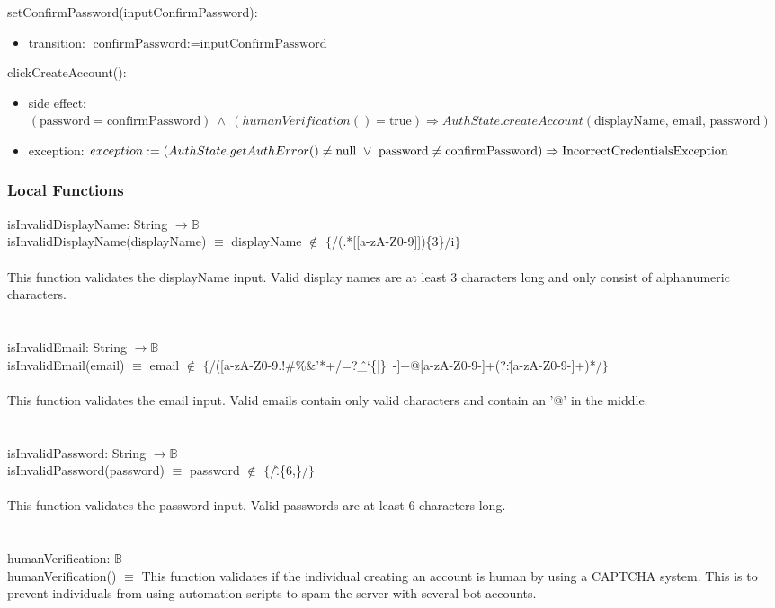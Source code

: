 \documentclass[12pt, titlepage]{article}
\begin{document}
\noindent setConfirmPassword(inputConfirmPassword):
\begin{itemize}
\item transition: $\text{confirmPassword} := \text{inputConfirmPassword}$
\end{itemize}

\noindent clickCreateAccount():
\begin{itemize}
\item side effect: \\$(\text{password} = \text{confirmPassword}) \ \land \ (humanVerification() = \text{true}) \Rightarrow AuthState.createAccount(\text{displayName, email, password})$
\item exception: $exception := (AuthState.getAuthError() \neq \text{null} \ \lor \  \text{password} \neq \text{confirmPassword}) \\ \Rightarrow \text{IncorrectCredentialsException}$ 
\end{itemize}

\subsubsection{Local Functions}
isInvalidDisplayName: String $\rightarrow \mathbb{B}$  \\
isInvalidDisplayName(displayName) $\equiv$ displayName $\notin$ $\{$/(.*[[a-zA-Z0-9]])\{3\}/i$\}$ 
\\ \\
This function validates the displayName input. Valid display names are at least 3 characters long and only consist of alphanumeric characters. \\ 
\\ 
\\
isInvalidEmail: String $\rightarrow \mathbb{B}$  \\
isInvalidEmail(email) $\equiv$ email $\notin$ $\{$/([a-zA-Z0-9.!\#\%\&'*+/=?\^\_`\{|\}~-]+@[a-zA-Z0-9-]+(?:\.[a-zA-Z0-9-]+)*/$\}$ 
\\ \\
This function validates the email input. Valid emails contain only valid characters and contain an '@' in the middle. \\
\\
\\
isInvalidPassword: String $\rightarrow \mathbb{B}$  \\
isInvalidPassword(password) $\equiv$ password $\notin$ $\{$/\^.\{6,\}/$\}$ 
\\ \\
This function validates the password input. Valid passwords are at least 6 characters long.  
\\ \\
\\
humanVerification: $\mathbb{B}$\\
humanVerification() $\equiv$ This function validates if the individual creating an account is human by using a CAPTCHA system. This is to prevent individuals from using automation scripts to spam the server with several bot accounts.
\end{document}
